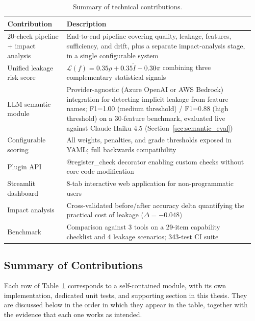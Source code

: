 \documentclass[12pt,a4paper]{report}
\newcommand{\tblhead}{\rowcolor{tblHeadBg}\color{white}\bfseries}
\begin{document}
\begin{table}[!ht]
\centering
\caption{Summary of technical contributions.}
\label{tab:contributions}
\scriptsize
{}
\begin{tabularx}{\textwidth}{lX}
\toprule
\tblhead \textbf{Contribution} & \textbf{Description} \\
\midrule
20-check pipeline + impact analysis & End-to-end pipeline covering quality, leakage, features, sufficiency, and drift, plus a separate impact-analysis stage, in a single configurable system \\
Unified leakage risk score & $\mathcal{L}(f) = 0.35\rho + 0.35\tilde{I} + 0.30\pi$ combining three complementary statistical signals \\
LLM semantic module & Provider-agnostic (Azure OpenAI or AWS Bedrock) integration for detecting implicit leakage from feature names; F1=1.00 (medium threshold) / F1=0.88 (high threshold) on a 30-feature benchmark, evaluated live against Claude Haiku 4.5 (Section~\ref{sec:semantic_eval}) \\
Configurable scoring & All weights, penalties, and grade thresholds exposed in YAML; full backwards compatibility \\
Plugin API & @register\_check decorator enabling custom checks without core code modification \\
Streamlit dashboard & 8-tab interactive web application for non-programmatic users \\
Impact analysis & Cross-validated before/after accuracy delta quantifying the practical cost of leakage ($\Delta{=}{-}0.048$) \\
Benchmark & Comparison against 3 tools on a 29-item capability checklist and 4 leakage scenarios; 343-test CI suite \\
\bottomrule
\end{tabularx}
\end{table}

\subsection{Summary of Contributions}

Each row of Table~\ref{tab:contributions} corresponds to a self-contained module, with its
own implementation, dedicated unit tests, and supporting section in this thesis.  They are
discussed below in the order in which they appear in the table, together with the evidence
that each one works as intended.
\end{document}

